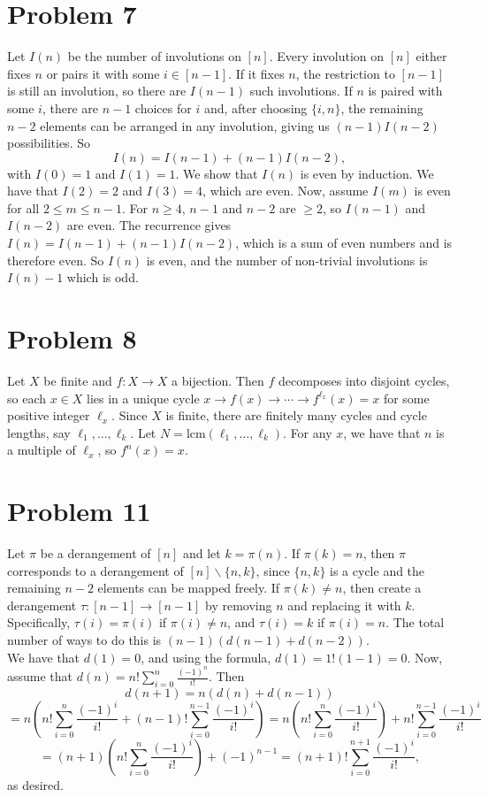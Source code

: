\documentclass{article}
\begin{document}
\section*{Problem 7}
Let $I(n)$ be the number of involutions on $[n]$. Every involution on $[n]$ either fixes $n$ or pairs it with some $i \in [n - 1]$. If it fixes $n$, the restriction to $[n - 1]$ is still an involution, so there are $I(n - 1)$ such involutions. If $n$ is paired with some $i$, there are $n - 1$ choices for $i$ and, after choosing $\{i, n\}$, the remaining $n - 2$ elements can be arranged in any involution, giving us $(n - 1)I(n - 2)$ possibilities. So
$$I(n) = I(n - 1) + (n - 1)I(n - 2),$$
with $I(0) = 1$ and $I(1) = 1$. We show that $I(n)$ is even by induction. We have that $I(2) = 2$ and $I(3) = 4$, which are even. Now, assume $I(m)$ is even for all $2 \le m \le n - 1$. For $n \ge 4$, $n - 1$ and $n - 2$ are $\ge 2$, so $I(n - 1)$ and $I(n - 2)$ are even. The recurrence gives $I(n) = I(n - 1) + (n - 1)I(n - 2)$, which is a sum of even numbers and is therefore even. So $I(n)$ is even, and the number of non-trivial involutions is $I(n) - 1$ which is odd.

\section*{Problem 8}
Let $X$ be finite and $f: X\to X$ a bijection. Then $f$ decomposes into disjoint cycles, so each $x \in X$ lies in a unique cycle $x \to f(x) \to \cdots \to f^{\ell_x}(x) = x$ for some positive integer $\ell_x$. Since $X$ is finite, there are finitely many cycles and cycle lengths, say $\ell_1, \ldots, \ell_k$. Let $N = \text{lcm}(\ell_1, \ldots, \ell_k)$. For any $x$, we have that $n$ is a multiple of $\ell_x$, so $f^n(x) = x$.

\section*{Problem 11}
Let $\pi$ be a derangement of $[n]$ and let $k = \pi(n)$. If $\pi(k) = n$, then $\pi$ corresponds to a derangement of $[n] \backslash \{n, k\}$, since $\{n, k\}$ is a cycle and the remaining $n - 2$ elements can be mapped freely. If $\pi(k) \neq n$, then create a derangement $\tau: [n - 1] \to [n - 1]$ by removing $n$ and replacing it with $k$. Specifically, $\tau(i) = \pi(i)$ if $\pi(i) \neq n$, and $\tau(i) = k$ if $\pi(i) = n$. The total number of ways to do this is $(n - 1)(d(n - 1) + d(n - 2))$. \\

We have that $d(1) = 0$, and using the formula, $d(1) = 1!(1 - 1) = 0$. Now, assume that $d(n) = n!\sum_{i = 0}^n \frac{(-1)^n}{i!}$. Then
$$d(n + 1) = n(d(n) + d(n - 1))$$
$$= n\left(n!\sum_{i = 0}^n \frac{(-1)^i}{i!} + (n - 1)!\sum_{i = 0}^{n - 1}\frac{(-1)^i}{i!}\right) = n\left(n!\sum_{i = 0}^n \frac{(-1)^i}{i!}\right) + n!\sum_{i = 0}^{n - 1}\frac{(-1)^i}{i!}$$
$$= (n + 1)\left(n!\sum_{i = 0}^n \frac{(-1)^i}{i!}\right) + (-1)^{n - 1} = (n + 1)!\sum_{i = 0}^{n + 1} \frac{(-1)^i}{i!},$$
as desired.
\end{document}
